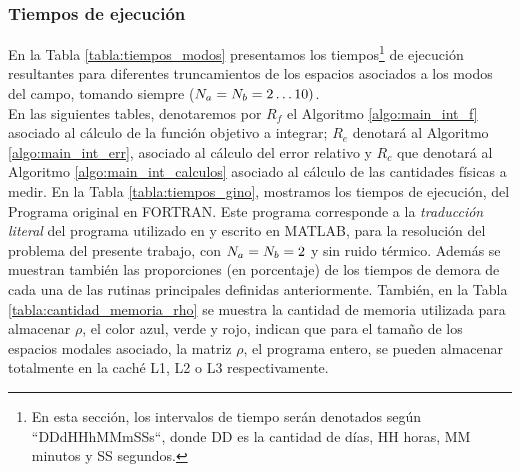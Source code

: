 \subsubsection{Tiempos de ejecuci\'on} \qquad En la Tabla \ref{tabla:tiempos_modos} presentamos los tiempos\footnote{En esta secci\'on, los intervalos de tiempo ser\'an denotados seg\'un ``DDdHHhMMmSSs``, donde DD es la cantidad de d\'ias, HH horas, MM minutos y SS segundos.} de ejecuci\'on resultantes para diferentes truncamientos de los espacios asociados a los modos del campo, tomando siempre ($N_a=N_b=2\ldots 10)$.\\
\quad En las siguientes tables, denotaremos por $R_f$ el Algoritmo \ref{algo:main_int_f} asociado al c\'alculo de la funci\'on objetivo a integrar; $R_e$ denotar\'a al Algoritmo \ref{algo:main_int_err}, asociado al c\'alculo del error relativo y $R_c$ que denotar\'a al Algoritmo \ref{algo:main_int_calculos} asociado al c\'alculo de las cantidades f\'isicas a medir. En la Tabla \ref{tabla:tiempos_gino}, mostramos los tiempos de ejecuci\'on, del Programa original en FORTRAN. Este programa corresponde a la \emph{traducci\'on literal} del programa utilizado en \cite{gino} y escrito en MATLAB, para la resoluci\'on del problema del presente trabajo, con $N_a=N_b=2$ y sin ruido t\'ermico. Adem\'as se muestran tambi\'en las proporciones (en porcentaje) de los tiempos de demora de cada una de las rutinas principales definidas anteriormente. Tambi\'en, en la Tabla \ref{tabla:cantidad_memoria_rho} se muestra la cantidad de memoria utilizada para almacenar $\rho$, el color azul, verde y rojo, indican que para el tama\~no de los espacios modales asociado, la matriz $\rho$, el programa entero, se pueden almacenar totalmente en la cach\'e L1, L2 o L3 respectivamente.\\

